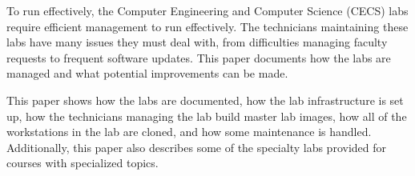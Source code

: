 \thispagestyle{empty}

To run effectively, the Computer Engineering and Computer Science (CECS) labs require efficient management to run effectively. The technicians maintaining these labs have many issues they must deal with, from difficulties managing faculty requests to frequent software updates. This paper documents how the labs are managed and what potential improvements can be made. 

This paper shows how the labs are documented, how the lab infrastructure is set up, how the technicians managing the lab build master lab images, how all of the workstations in the lab are cloned, and how some maintenance is handled.  Additionally, this paper also describes some of the specialty labs provided for courses with specialized topics. 
